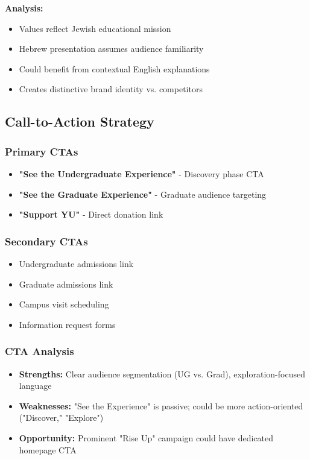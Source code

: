 \documentclass[12pt,letterpaper]{article}
\begin{document}
\textbf{Analysis:}
\begin{itemize}[leftmargin=*]
    \item Values reflect Jewish educational mission
    \item Hebrew presentation assumes audience familiarity
    \item Could benefit from contextual English explanations
    \item Creates distinctive brand identity vs. competitors
\end{itemize}

\subsection{Call-to-Action Strategy}

\subsubsection{Primary CTAs}
\begin{itemize}[leftmargin=*]
    \item \textbf{"See the Undergraduate Experience"} - Discovery phase CTA
    \item \textbf{"See the Graduate Experience"} - Graduate audience targeting
    \item \textbf{"Support YU"} - Direct donation link
\end{itemize}

\subsubsection{Secondary CTAs}
\begin{itemize}[leftmargin=*]
    \item Undergraduate admissions link
    \item Graduate admissions link
    \item Campus visit scheduling
    \item Information request forms
\end{itemize}

\subsubsection{CTA Analysis}
\begin{itemize}[leftmargin=*]
    \item \textbf{Strengths:} Clear audience segmentation (UG vs. Grad), exploration-focused language
    \item \textbf{Weaknesses:} "See the Experience" is passive; could be more action-oriented ("Discover," "Explore")
    \item \textbf{Opportunity:} Prominent "Rise Up" campaign could have dedicated homepage CTA
\end{itemize}
\end{document}
